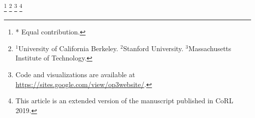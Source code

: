 \documentclass{article}
\author{
  \textbf{Rishi Veerapaneni$^{*,1}$}, \textbf{John D. Co-Reyes$^{*,1}$}, \textbf{Michael Chang$^{*,1}$}, \textbf{Michael Janner$^{1}$}
  \\\textbf{Chelsea Finn$^{2}$},  \textbf{Jiajun Wu$^{3}$}, \textbf{Joshua B. Tenenbaum$^{3}$}, \textbf{Sergey Levine$^{1}$}
}
\begin{document}
\let\svthefootnote\thefootnote
\let\thefootnote\relax\footnote{* Equal contribution.}
\let\thefootnote\relax\footnote{$^1$University of California Berkeley. $^2$Stanford University. $^3$Massachusetts Institute of Technology.}
\let\thefootnote\relax\footnote{Code and visualizations are available at \url{https://sites.google.com/view/op3website/}.}
\let\thefootnote\relax\footnote{This article is an extended version of the manuscript published in CoRL 2019.}
\let\thefootnote\svthefootnote
\maketitle

















\clearpage

\scriptsize
\normalsize
\newpage


\end{document}
